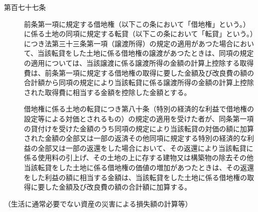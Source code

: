 \documentclass[twocolumn,a4j,10pt]{ltjtarticle}
\begin{document}
\begin{description}
\item[第百七十七条]前条第一項に規定する借地権（以下この条において「借地権」という。）に係る土地の同項に規定する転貸（以下この条において「転貸」という。）につき法第三十三条第一項（譲渡所得）の規定の適用があつた場合において、当該転貸をした土地に係る借地権の譲渡があつたときは、同項の規定の適用については、当該譲渡に係る譲渡所得の金額の計算上控除する取得費は、前条第一項に規定する借地権の取得に要した金額及び改良費の額の合計額から同項の規定により当該転貸に係る譲渡所得の金額の計算上控除された取得費に相当する金額を控除した金額とする。
\item[]借地権に係る土地の転貸につき第八十条（特別の経済的な利益で借地権の設定等による対価とされるもの）の規定の適用を受けた者が、同条第一項の貸付けを受けた金額のうち同項の規定により当該転貸の対価の額に加算された金額の全部又は一部の返済その他同項に規定する特別の経済的な利益の全部又は一部の返還をした場合において、その返還により当該転貸に係る使用料の引上げ、その土地の上に存する建物又は構築物の除去その他当該転貸をした土地に係る借地権の価値の増加があつたときは、その返還をした利益の額に相当する金額は、当該転貸をした土地に係る借地権の取得に要した金額及び改良費の額の合計額に加算する。
\end{description}
\noindent\hspace{10pt}（生活に通常必要でない資産の災害による損失額の計算等）
\end{document}
